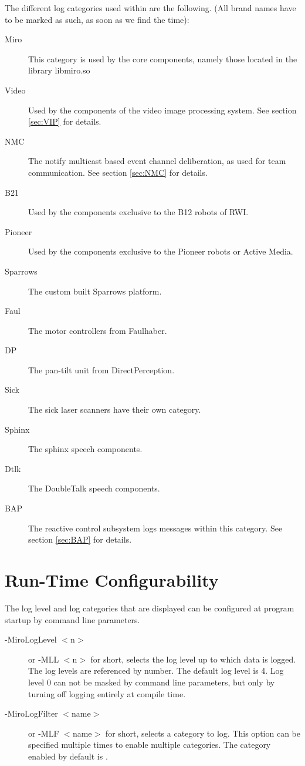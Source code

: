 The different log categories used within \miro are the
following. (All brand names have to be marked as such, as soon as we
find the time):
\begin{description}
\item[Miro] This category is used by the \miro core components,
  namely those located in the library libmiro.so
\item[Video] Used by the components of the video image processing
  system. See section \ref{sec:VIP} for details.
\item[NMC] The notify multicast based event channel deliberation, as
  used for team communication. See section \ref{sec:NMC} for details.
\item[B21] Used by the components exclusive to the B12 robots of RWI.
\item[Pioneer] Used by the components exclusive to the Pioneer robots
  or Active Media.
\item[Sparrows] The custom built Sparrows platform.
\item[Faul] The motor controllers from Faulhaber.
\item[DP] The pan-tilt unit from DirectPerception.
\item[Sick] The sick laser scanners have their own category.
\item[Sphinx] The sphinx speech components.
\item[Dtlk] The DoubleTalk speech components.
\item[BAP] The reactive control subsystem logs messages within this
  category. See section \ref{sec:BAP} for details.
\end{description}

\section{Run-Time Configurability}

The log level and log categories that are displayed can be configured
at program startup by command line parameters.

\begin{description}
\item[-MiroLogLevel $<$n$>$] or -MLL $<$n$>$ for short, selects the log level
  up to which data is logged. The log levels are referenced by number.
  The default log level is 4. Log level 0 can not be masked by command
  line parameters, but only by turning off logging entirely at compile
  time.
\item[-MiroLogFilter $<$name$>$] or -MLF $<$name$>$ for short, selects a
  category to log. This option can be specified multiple times to
  enable multiple categories. The category enabled by default is
  \miro.
\end{description}

